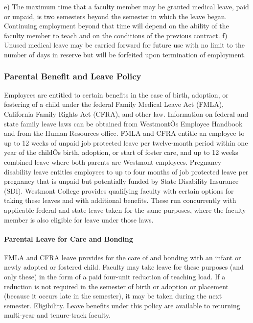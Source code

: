 \documentclass[letterpaper, 11pt]{article}
\begin{document}
			e) The maximum time that a faculty member may be granted medical leave, paid or unpaid, is two semesters beyond the semester in which the leave began.  Continuing employment beyond that time will depend on the ability of the faculty member to teach and on the conditions of the previous contract.
			f) Unused medical leave may be carried forward for future use with no limit to the number of days in reserve but will be forfeited upon termination of employment.

		\subsubsection{Parental Benefit and Leave Policy}
			Employees are entitled to certain benefits in the case of birth, adoption, or fostering of a child under the federal Family Medical Leave Act (FMLA), California Family Rights Act (CFRA), and other law. Information on federal and state family leave laws can be obtained from WestmontÕs Employee Handbook and from the Human Resources office. FMLA and CFRA entitle an employee to up to 12 weeks of unpaid job protected leave per twelve-month period within one year of the childÕs birth, adoption, or start of foster care, and up to 12 weeks combined leave where both parents are Westmont employees. Pregnancy disability leave entitles employees to up to four months of job protected leave per pregnancy that is unpaid but potentially funded by State Disability Insurance (SDI).
			Westmont College provides qualifying faculty with certain options for taking these leaves and with additional benefits. These run concurrently with applicable federal and state leave taken for the same purposes, where the faculty member is also eligible for leave under those laws.

			\paragraph{Parental Leave for Care and Bonding}
				FMLA and CFRA leave provides for the care of and bonding with an infant or newly adopted or fostered child. Faculty may take leave for these purposes (and only these) in the form of a paid four-unit reduction of teaching load. If a reduction is not required in the semester of birth or adoption or placement (because it occurs late in the semester), it may be taken during the next semester.
				Eligibility. Leave benefits under this policy are available to returning multi-year and tenure-track faculty.
\end{document}
